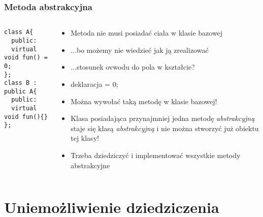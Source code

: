 \documentclass[10pt]{beamer}
\begin{document}
\begin{frame}[fragile]
  \frametitle{Metoda abstrakcyjna}
  \begin{columns}
    \begin{column}{0.49\textwidth}
      \begin{lstlisting}
class A{
  public:
  virtual void fun() = 0;
};
class B : public A{
  public:
  virtual void fun(){}
};
\end{lstlisting}
    \end{column}
    \begin{column}{0.6\textwidth}
    \begin{itemize}
  \item Metoda nie musi posiadać ciała w klasie bazowej
  \item ...bo możemy nie wiedzieć jak ją zrealizować
  \item ...stosunek ovwodu do pola w kształcie?
  \item deklaracja = 0;
  \item Można wywołać taką metodę w klasie bazowej!
  \item Klasa posiadająca przynajmniej jedna metodę \textit{abstrakcyjną} staje się klasą \textit{abstrakcyjną} i nie można stworzyć już obiektu tej klasy!
  \item Trzeba dziedziczyć i implementować wszystkie metody abstrakcyjne
\end{itemize}
    \end{column}
  \end{columns}
\end{frame}

\section{Uniemożliwienie dziedziczenia}
\end{document}
